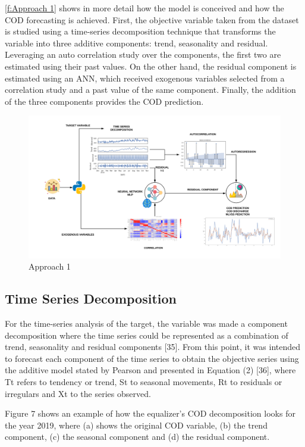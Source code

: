 \autoref{f:Approach 1} shows in more detail how the model is conceived and how the COD forecasting is achieved. First, the objective variable taken from the dataset is studied using a time-series decomposition technique that transforms the variable into three additive components: trend, seasonality and residual. Leveraging an auto correlation study over the components, the first two are estimated using their past values. On the other hand, the residual component is estimated using an ANN, which received exogenous variables selected from a correlation study and a past value of the same component. Finally, the addition of the three components provides the COD prediction. 

\begin{figure}[h]
\centering
\includegraphics[width=\linewidth]{figures/Ch4/Approach1.png}
\caption{Approach 1}
\label{f:Approach 1}
\end{figure}

\subsection{Time Series Decomposition}
For the time-series analysis of the target, the variable was made a component decomposition where the time series could be represented as a combination of trend, seasonality and residual components [35]. From this point, it was intended to forecast each component of the time series to obtain the objective series using the additive model stated by Pearson and presented in Equation (2) [36], where Tt refers to tendency or trend, St to seasonal movements, Rt to residuals or irregulars and Xt to the series observed.

Figure 7 shows an example of how the equalizer’s COD decomposition looks for the year 2019, where (a) shows the original COD variable, (b) the trend component, (c) the seasonal component and (d) the residual component.

